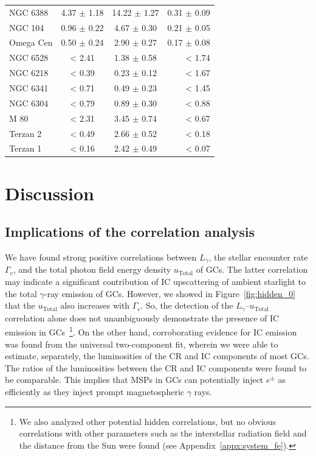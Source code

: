 \documentclass[doublespace,nopageskip]{VTthesis} %
\begin{document}
\begin{table}
\begin{tabular}{lccr}
NGC 6388 & 4.37 $\pm$ 1.18 & 14.22 $\pm$ 1.27 & 0.31 $\pm$ 0.09 \\
NGC 104 & 0.96 $\pm$ 0.22 & 4.67 $\pm$ 0.30 & 0.21 $\pm$ 0.05 \\
Omega Cen & 0.50 $\pm$ 0.24 & 2.90 $\pm$ 0.27 & 0.17 $\pm$ 0.08 \\
NGC 6528 & < 2.41 & 1.38 $\pm$ 0.58 & < 1.74 \\
NGC 6218 & < 0.39  &  0.23 $\pm$ 0.12 & < 1.67 \\
NGC 6341 & < 0.71  &  0.49 $\pm$ 0.23 & < 1.45 \\
NGC 6304 & < 0.79  &  0.89 $\pm$ 0.30 & < 0.88 \\
M 80 & < 2.31  &  3.45 $\pm$ 0.74 & < 0.67 \\
Terzan 2 & < 0.49  &  2.66 $\pm$ 0.52 & < 0.18 \\
Terzan 1 & < 0.16  &  2.42 $\pm$ 0.49 & < 0.07 \\
\hline
    \end{tabular}
    \label{tab:ratio}
\end{table}

\section{Discussion}\label{sec:discussion}

\subsection{Implications of the correlation analysis}

We have found strong positive correlations between $L_\gamma$, the stellar encounter rate $\Gamma_c$, and the total photon field energy density $u_\mathrm{Total}$ of GCs. The latter correlation may indicate a significant contribution of IC upscattering of ambient starlight to the total $\gamma$-ray emission of GCs. However, we showed in Figure~\ref{fig:hidden_0} that the $u_\mathrm{Total}$ also increases with $\Gamma_c$. So, the detection of the $L_\gamma$--$u_\mathrm{Total}$ correlation alone does not unambiguously demonstrate the presence of IC emission in GCs~\footnote{We also analyzed other potential hidden correlations, but no obvious correlations with other parameters such as the interstellar radiation field and the distance from the Sun were found (see Appendix~\ref{appx:system_fe}).}. On the other hand, corroborating evidence for IC emission was found from the universal two-component fit, wherein we were able to estimate, separately, the luminosities of the CR and IC components of most GCs. The ratios of the luminosities between the CR and IC components were found to be comparable. This implies that MSPs in GCs can potentially inject $e^{\pm}$ as efficiently as they inject prompt magnetospheric $\gamma$ rays.
\end{document}
